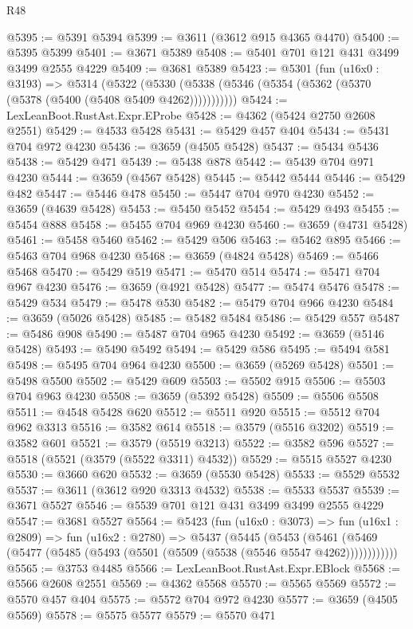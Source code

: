 \begin{lexlean}{R48}
\begin{coremodule}
@5395 := @5391 @5394
@5399 := @3611 (@3612 @915 @4365 @4470)
@5400 := @5395 @5399
@5401 := @3671 @5389
@5408 := @5401 @701 @121 @431 @3499 @3499 @2555 @4229
@5409 := @3681 @5389
@5423 := @5301
    (fun (u16x0 : @3193) =>
    @5314
      (@5322 (@5330 (@5338 (@5346 (@5354 (@5362 (@5370 (@5378 (@5400 (@5408 @5409 @4262)))))))))))
@5424 := LexLeanBoot.RustAst.Expr.EProbe
@5428 := @4362 (@5424 @2750 @2608 @2551)
@5429 := @4533 @5428
@5431 := @5429 @457 @404
@5434 := @5431 @704 @972 @4230
@5436 := @3659 (@4505 @5428)
@5437 := @5434 @5436
@5438 := @5429 @471
@5439 := @5438 @878
@5442 := @5439 @704 @971 @4230
@5444 := @3659 (@4567 @5428)
@5445 := @5442 @5444
@5446 := @5429 @482
@5447 := @5446 @478
@5450 := @5447 @704 @970 @4230
@5452 := @3659 (@4639 @5428)
@5453 := @5450 @5452
@5454 := @5429 @493
@5455 := @5454 @888
@5458 := @5455 @704 @969 @4230
@5460 := @3659 (@4731 @5428)
@5461 := @5458 @5460
@5462 := @5429 @506
@5463 := @5462 @895
@5466 := @5463 @704 @968 @4230
@5468 := @3659 (@4824 @5428)
@5469 := @5466 @5468
@5470 := @5429 @519
@5471 := @5470 @514
@5474 := @5471 @704 @967 @4230
@5476 := @3659 (@4921 @5428)
@5477 := @5474 @5476
@5478 := @5429 @534
@5479 := @5478 @530
@5482 := @5479 @704 @966 @4230
@5484 := @3659 (@5026 @5428)
@5485 := @5482 @5484
@5486 := @5429 @557
@5487 := @5486 @908
@5490 := @5487 @704 @965 @4230
@5492 := @3659 (@5146 @5428)
@5493 := @5490 @5492
@5494 := @5429 @586
@5495 := @5494 @581
@5498 := @5495 @704 @964 @4230
@5500 := @3659 (@5269 @5428)
@5501 := @5498 @5500
@5502 := @5429 @609
@5503 := @5502 @915
@5506 := @5503 @704 @963 @4230
@5508 := @3659 (@5392 @5428)
@5509 := @5506 @5508
@5511 := @4548 @5428 @620
@5512 := @5511 @920
@5515 := @5512 @704 @962 @3313
@5516 := @3582 @614
@5518 := @3579 (@5516 @3202)
@5519 := @3582 @601
@5521 := @3579 (@5519 @3213)
@5522 := @3582 @596
@5527 := @5518 (@5521 (@3579 (@5522 @3311) @4532))
@5529 := @5515 @5527 @4230
@5530 := @3660 @620
@5532 := @3659 (@5530 @5428)
@5533 := @5529 @5532
@5537 := @3611 (@3612 @920 @3313 @4532)
@5538 := @5533 @5537
@5539 := @3671 @5527
@5546 := @5539 @701 @121 @431 @3499 @3499 @2555 @4229
@5547 := @3681 @5527
@5564 := @5423
    (fun (u16x0 : @3073) =>
    fun (u16x1 : @2809) =>
    fun (u16x2 : @2780) =>
    @5437
      (@5445
        (@5453
          (@5461 (@5469 (@5477 (@5485 (@5493 (@5501 (@5509 (@5538 (@5546 @5547 @4262))))))))))))
@5565 := @3753 @4485
@5566 := LexLeanBoot.RustAst.Expr.EBlock
@5568 := @5566 @2608 @2551
@5569 := @4362 @5568
@5570 := @5565 @5569
@5572 := @5570 @457 @404
@5575 := @5572 @704 @972 @4230
@5577 := @3659 (@4505 @5569)
@5578 := @5575 @5577
@5579 := @5570 @471

\end{coremodule}
\end{lexlean}
